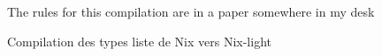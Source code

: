 \begin{figure}
  \center
  The rules for this compilation are in a paper somewhere in my desk
  \caption{Compilation des types liste de Nix vers Nix-light}\label{tyage::listes::compilation}
\end{figure}
